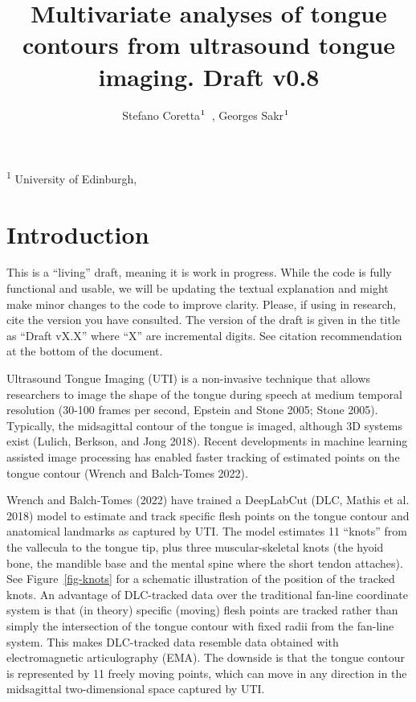 \documentclass[
]{interact}
\title{Multivariate analyses of tongue contours from ultrasound tongue
imaging. Draft v0.8}
\author{Stefano
Coretta$\textsuperscript{1}$~\orcidlink{0000-0001-9627-5532}, Georges
Sakr$\textsuperscript{1}$~\orcidlink{0000-0003-3813-2669}}
\begin{document}
\captionsetup{labelsep=space}
\maketitle
\textsuperscript{1}  University of Edinburgh,  


\section{Introduction}\label{introduction}

\begin{tcolorbox}[enhanced jigsaw, coltitle=black, breakable, opacityback=0, toprule=.15mm, colbacktitle=quarto-callout-warning-color!10!white, rightrule=.15mm, leftrule=.75mm, bottomrule=.15mm, title=\textcolor{quarto-callout-warning-color}{\faExclamationTriangle}\hspace{0.5em}{Warning}, titlerule=0mm, toptitle=1mm, colframe=quarto-callout-warning-color-frame, colback=white, opacitybacktitle=0.6, arc=.35mm, left=2mm, bottomtitle=1mm]

This is a ``living'' draft, meaning it is work in progress. While the
code is fully functional and usable, we will be updating the textual
explanation and might make minor changes to the code to improve clarity.
Please, if using in research, cite the version you have consulted. The
version of the draft is given in the title as ``Draft vX.X'' where ``X''
are incremental digits. See citation recommendation at the bottom of the
document.

\end{tcolorbox}

Ultrasound Tongue Imaging (UTI) is a non-invasive technique that allows
researchers to image the shape of the tongue during speech at medium
temporal resolution (30-100 frames per second, Epstein and Stone 2005;
Stone 2005). Typically, the midsagittal contour of the tongue is imaged,
although 3D systems exist (Lulich, Berkson, and Jong 2018). Recent
developments in machine learning assisted image processing has enabled
faster tracking of estimated points on the tongue contour (Wrench and
Balch-Tomes 2022).

Wrench and Balch-Tomes (2022) have trained a DeepLabCut (DLC, Mathis et
al. 2018) model to estimate and track specific flesh points on the
tongue contour and anatomical landmarks as captured by UTI. The model
estimates 11 ``knots'' from the vallecula to the tongue tip, plus three
muscular-skeletal knots (the hyoid bone, the mandible base and the
mental spine where the short tendon attaches). See
Figure~\ref{fig-knots} for a schematic illustration of the position of
the tracked knots. An advantage of DLC-tracked data over the traditional
fan-line coordinate system is that (in theory) specific (moving) flesh
points are tracked rather than simply the intersection of the tongue
contour with fixed radii from the fan-line system. This makes
DLC-tracked data resemble data obtained with electromagnetic
articulography (EMA). The downside is that the tongue contour is
represented by 11 freely moving points, which can move in any direction
in the midsagittal two-dimensional space captured by UTI.
\end{document}
